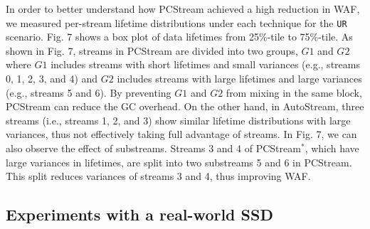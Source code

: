 In order to better understand how \textsf{\small PCStream} achieved a high reduction in WAF, 
we measured per-stream lifetime distributions under each technique for the \texttt{UR} scenario.
Fig. 7 shows a box plot of data lifetimes from 25\%-tile to 75\%-tile.
As shown in Fig. 7, 
streams in \textsf{\small PCStream} are divided into two groups, 
$G1$ and $G2$ where $G1$ includes streams with short lifetimes and small variances (e.g., streams 0, 1, 2, 3, and 4) 
and $G2$ includes streams with large lifetimes and large variances (e.g., streams 5 and 6).  
By preventing $G1$ and $G2$ from mixing in the same block, 
\textsf{\small PCStream} can reduce the GC overhead.  
On the other hand, in \textsf{\small AutoStream}, 
three streams (i.e., streams 1, 2, and 3) show similar lifetime distributions with large variances, 
thus not effectively taking full advantage of streams.
In Fig. 7, we can also observe the effect of substreams.  
Streams 3 and 4 of \textsf{\small PCStream$^{*}$}, 
which have large variances in lifetimes, are split into two substreams 5 and 6 in \textsf{\small PCStream}.
This split reduces variances of streams 3 and 4, thus improving WAF. 

\vspace{-10pt}
\subsection{Experiments with a real-world SSD}


